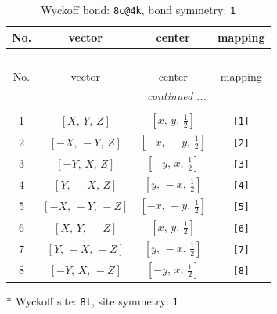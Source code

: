 \documentclass[fleqn,8pt]{jsarticle}
\begin{document}
\renewcommand{\arraystretch}{1.2}
\begin{longtable}{cccc}
\caption{Wyckoff bond: {\tt 8c@4k}, bond symmetry: {\tt 1}}
 \\
 \hline \hline
No. & vector & center & mapping \\ \hline \endfirsthead

\multicolumn{3}{l}{\tablename\ \thetable{}} \\
 \hline \hline
No. & vector & center & mapping \\ \hline \endhead

 \hline \hline
\multicolumn{3}{r}{\footnotesize\it continued ...} \\ \endfoot

 \hline \hline
\multicolumn{3}{r}{} \\ \endlastfoot

1 & $\left[ X,\, Y,\, Z \right]$ & $\left[ x,\, y,\, \frac{1}{2} \right]$ & {\tt [1]} \\ \hline
2 & $\left[ - X,\, - Y,\, Z \right]$ & $\left[ - x,\, - y,\, \frac{1}{2} \right]$ & {\tt [2]} \\ \hline
3 & $\left[ - Y,\, X,\, Z \right]$ & $\left[ - y,\, x,\, \frac{1}{2} \right]$ & {\tt [3]} \\ \hline
4 & $\left[ Y,\, - X,\, Z \right]$ & $\left[ y,\, - x,\, \frac{1}{2} \right]$ & {\tt [4]} \\ \hline
5 & $\left[ - X,\, - Y,\, - Z \right]$ & $\left[ - x,\, - y,\, \frac{1}{2} \right]$ & {\tt [5]} \\ \hline
6 & $\left[ X,\, Y,\, - Z \right]$ & $\left[ x,\, y,\, \frac{1}{2} \right]$ & {\tt [6]} \\ \hline
7 & $\left[ Y,\, - X,\, - Z \right]$ & $\left[ y,\, - x,\, \frac{1}{2} \right]$ & {\tt [7]} \\ \hline
8 & $\left[ - Y,\, X,\, - Z \right]$ & $\left[ - y,\, x,\, \frac{1}{2} \right]$ & {\tt [8]} \\
\end{longtable}
* Wyckoff site: {\tt 8l}, site symmetry: {\tt 1}
\renewcommand{\arraystretch}{1.2}
\end{document}
